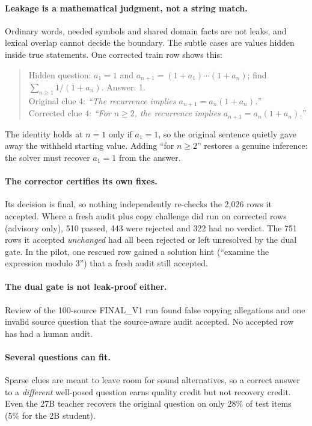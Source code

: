 \documentclass[11pt,a4paper]{article}
\begin{document}
\paragraph{Leakage is a mathematical judgment, not a string match.} Ordinary words, needed symbols and shared domain facts are not leaks, and lexical overlap cannot decide the boundary. The subtle cases are values hidden inside true statements. One corrected train row shows this:
\begin{quote}\small
Hidden question: $a_1 = 1$ and $a_{n+1} = (1 + a_1)\cdots(1 + a_n)$; find $\sum_{n \geq 1} 1/(1 + a_n)$. Answer: 1.\\
Original clue 4: \emph{``The recurrence implies $a_{n+1} = a_n(1 + a_n)$.''}\\
Corrected clue 4: \emph{``For $n \geq 2$, the recurrence implies $a_{n+1} = a_n(1 + a_n)$.''}
\end{quote}
The identity holds at $n = 1$ only if $a_1 = 1$, so the original sentence quietly gave away the withheld starting value. Adding ``for $n \geq 2$'' restores a genuine inference: the solver must recover $a_1 = 1$ from the answer.

\paragraph{The corrector certifies its own fixes.} Its decision is final, so nothing independently re-checks the 2,026 rows it accepted. Where a fresh audit plus copy challenge did run on corrected rows (advisory only), 510 passed, 443 were rejected and 322 had no verdict. The 751 rows it accepted \emph{unchanged} had all been rejected or left unresolved by the dual gate. In the pilot, one rescued row gained a solution hint (``examine the expression modulo 3'') that a fresh audit still accepted.

\paragraph{The dual gate is not leak-proof either.} Review of the 100-source FINAL\_V1 run found false copying allegations and one invalid source question that the source-aware audit accepted. No accepted row has had a human audit.

\paragraph{Several questions can fit.} Sparse clues are meant to leave room for sound alternatives, so a correct answer to a \emph{different} well-posed question earns quality credit but not recovery credit. Even the 27B teacher recovers the original question on only 28\% of test items (5\% for the 2B student).
\end{document}

